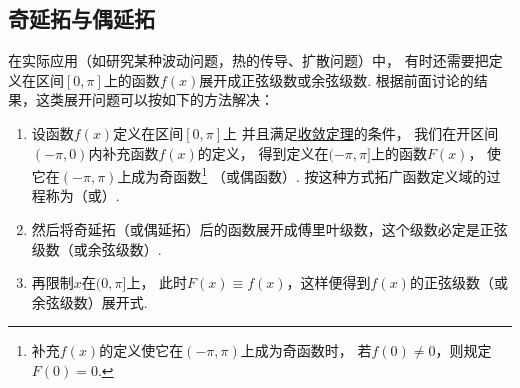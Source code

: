 \subsection{奇延拓与偶延拓}
在实际应用（如研究某种波动问题，热的传导、扩散问题）中，
有时还需要把定义在区间\([0,\pi]\)上的函数\(f(x)\)展开成正弦级数或余弦级数.
根据前面讨论的结果，这类展开问题可以按如下的方法解决：
\begin{enumerate}
\item 设函数\(f(x)\)定义在区间\([0,\pi]\)上%
并且满足\hyperref[theorem:无穷级数.傅里叶级数收敛的狄利克雷充分条件]{收敛定理}的条件，
我们在开区间\((-\pi,0)\)内补充函数\(f(x)\)的定义，
得到定义在\((-\pi,\pi]\)上的函数\(F(x)\)，
使它在\((-\pi,\pi)\)上成为奇函数\footnote{%
补充\(f(x)\)的定义使它在\((-\pi,\pi)\)上成为奇函数时，
若\(f(0)\neq0\)，则规定\(F(0)=0\).}%
（或偶函数）.
按这种方式拓广函数定义域的过程称为（或）.

\item 然后将奇延拓（或偶延拓）后的函数展开成傅里叶级数，这个级数必定是正弦级数（或余弦级数）.

\item 再限制\(x\)在\((0,\pi]\)上，
此时\(F(x)\equiv f(x)\)，这样便得到\(f(x)\)的正弦级数（或余弦级数）展开式.
\end{enumerate}

